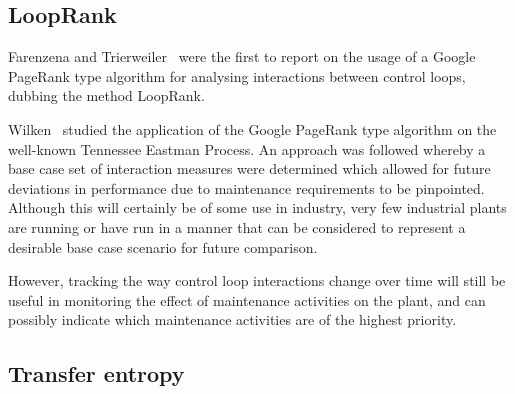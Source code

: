 \subsection{LoopRank}

Farenzena and Trierweiler~\cite{Farenzena2009} were the first to report on the usage of a Google PageRank type algorithm for analysing interactions between control loops, dubbing the method LoopRank.

Wilken~\cite{Wilken2012} studied the application of the Google PageRank type algorithm on the well-known Tennessee Eastman Process.
An approach was followed whereby a base case set of interaction measures were determined which allowed for future deviations in performance due to maintenance requirements to be pinpointed.
Although this will certainly be of some use in industry, very few industrial plants are running or have run in a manner that can be considered to represent a desirable base case scenario for future comparison.

However, tracking the way control loop interactions change over time will still be useful in monitoring the effect of maintenance activities on the plant, and can possibly indicate which maintenance activities are of the highest priority.



\subsection{Transfer entropy}




